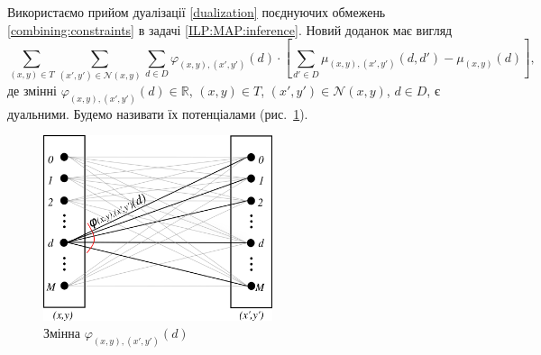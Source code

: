 Використаємо прийом дуалізації \eqref{dualization}
поєднуючих обмежень \eqref{combining:constraints}
в задачі \eqref{ILP:MAP:inference}.
Новий доданок має вигляд
\begin{equation} \label{dualized:term}
    \sum \limits_{\left(x, y \right) \in T}
        \sum \limits_{\left(x', y' \right) \in \mathcal{N} \left(x, y \right)}
            \sum \limits_{d \in D}
                \varphi_{\left(x, y \right), \left(x', y' \right)} \left(
                    d
                \right) \cdot \left[
                    \sum \limits_{d' \in D}
                        \mu_{\left(x, y \right), \left(x', y' \right)} \left(
                            d, d'
                        \right) - \mu_{\left(x, y \right)} \left(d \right)
                \right],
\end{equation}
де змінні
$\varphi_{\left(x, y \right), \left(x', y' \right)} \left( d \right) \in
    \mathbb{R}$,
$\left(x, y \right) \in T$,
$\left(x', y' \right) \in \mathcal{N} \left(x, y \right)$,
$d \in D$,
є дуальними.
Будемо називати їх потенціалами (рис.~\ref{fig:phi:block}).

\begin{figure}[h]
  \centering
  \includegraphics[width=0.6\textwidth]{images/phi_block}
  \caption{Змінна $\varphi_{\left(x, y \right), \left(x', y' \right)} \left(d \right)$}
  \label{fig:phi:block}
\end{figure}

